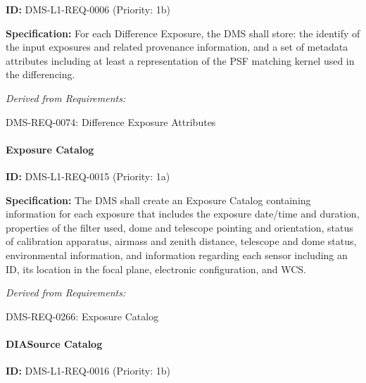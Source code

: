 \documentclass[SE,toc,lsstdraft]{lsstdoc}
\begin{document}
\label{DMS-L1-REQ-0006}
\textbf{ID:} DMS-L1-REQ-0006 (Priority: 1b)

\textbf{Specification:} For each Difference Exposure, the DMS shall store: the identify of the input exposures and related provenance information, and a set of metadata attributes including at least a representation of the PSF matching kernel used in the differencing.

\emph{Derived from Requirements:}

DMS-REQ-0074:
Difference Exposure Attributes \newline

\paragraph{Exposure Catalog}\hfill  %

\label{DMS-L1-REQ-0015}
\textbf{ID:} DMS-L1-REQ-0015 (Priority: 1a)

\textbf{Specification:} The DMS shall create an Exposure Catalog containing information for each exposure that includes the exposure date/time and duration, properties of the filter used, dome and telescope pointing and orientation, status of calibration apparatus, airmass and zenith distance, telescope and dome status, environmental information, and information regarding each sensor including an ID, its location in the focal plane, electronic configuration, and WCS.

\emph{Derived from Requirements:}

DMS-REQ-0266:
Exposure Catalog \newline

\paragraph{DIASource Catalog}\hfill  %

\label{DMS-L1-REQ-0016}
\textbf{ID:} DMS-L1-REQ-0016 (Priority: 1b)
\end{document}
